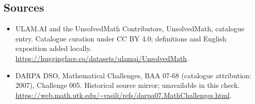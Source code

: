 \documentclass[11pt]{article}
\begin{document}
\subsection{Sources}
\begin{itemize}
\item[\hypertarget{source:statement:1}{S1}] ULAM.AI and the UnsolvedMath Contributors, UnsolvedMath, catalogue entry. Catalogue curation under CC BY 4.0; definitions and English exposition added locally.
\url{https://huggingface.co/datasets/ulamai/UnsolvedMath}.
\item[\hypertarget{source:statement:2}{S2}] DARPA DSO, Mathematical Challenges, BAA 07-68 (catalogue attribution: 2007), Challenge 005. Historical source mirror; unavailable in this check.
\url{https://web.math.utk.edu/~vasili/refs/darpa07.MathChallenges.html}.
\end{itemize}
\label{end:statement}
\end{document}
